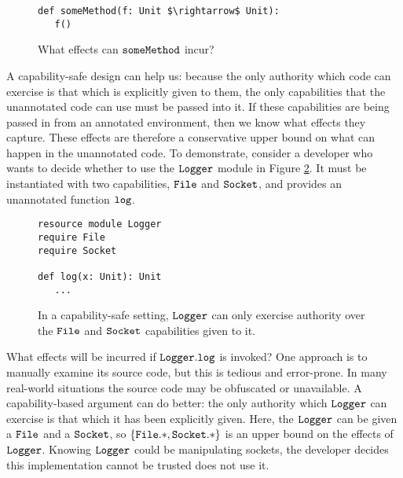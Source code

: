 \begin{figure}[h]
\begin{lstlisting}
def someMethod(f: Unit $\rightarrow$ Unit):
   f()
\end{lstlisting}
\vspace{-7pt}
\caption{What effects can $\mathtt{someMethod}$ incur?}
\label{fig:unannotated_reasoning}
\end{figure}

A capability-safe design can help us: because the only authority which code can exercise is that which is explicitly given to them, the only capabilities that the unannotated code can use must be passed into it. If these capabilities are being passed in from an annotated environment, then we know what effects they capture. These effects are therefore a conservative upper bound on what can happen in the unannotated code. To demonstrate, consider a developer who wants to decide whether to use the $\mathtt{Logger}$ module in Figure \ref{fig:cc_motivation}. It must be instantiated with two capabilities, $\mathtt{File}$ and $\mathtt{Socket}$, and provides an unannotated function $\mathtt{log}$.

\begin{figure}[h]
\begin{lstlisting}
resource module Logger
require File
require Socket

def log(x: Unit): Unit
   ...
\end{lstlisting}
\vspace{-7pt}
\caption{In a capability-safe setting, $\mathtt{Logger}$ can only exercise authority over the $\mathtt{File}$ and $\mathtt{Socket}$ capabilities given to it.}
\label{fig:cc_motivation}
\end{figure}

What effects will be incurred if $\mathtt{Logger.log}$ is invoked? One approach is to manually examine its source code, but this is tedious and error-prone. In many real-world situations the source code may be obfuscated or unavailable. A capability-based argument can do better: the only authority which $\mathtt{Logger}$ can exercise is that which it has been explicitly given. Here, the $\mathtt{Logger}$ can be given a $\mathtt{File}$ and a $\mathtt{Socket}$, so $\mathtt{ \{ \mathtt{File.*, Socket.*} \} }$ is an upper bound on the effects of $\mathtt{Logger}$. Knowing $\mathtt{Logger}$ could be manipulating sockets, the developer decides this implementation cannot be trusted does not use it.

